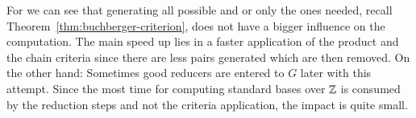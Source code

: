 For \singular we can see that generating all possible \spts and \gpts or only
the ones needed, recall Theorem~\ref{thm:buchberger-criterion}, does not have a
bigger influence on the computation. The main speed up lies in a faster
application of the product and the chain criteria since there are less pairs
generated which are then removed. On the other hand: Sometimes good reducers
are entered to $G$ later with this attempt. Since the most time for computing
standard bases over $\mathbb{Z}$ is consumed by the reduction steps and not the
criteria application, the impact is quite small.

